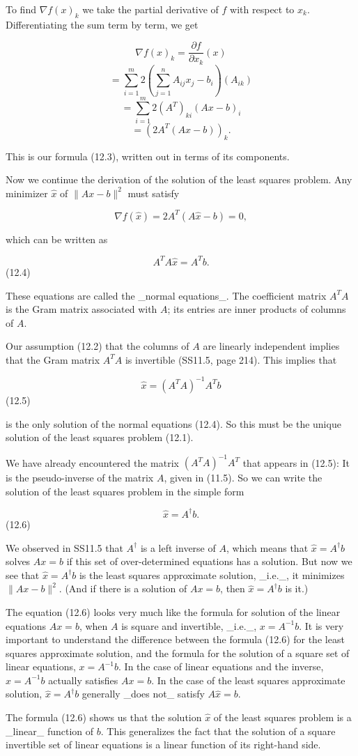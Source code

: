 To find \(\nabla f(x)_{k}\) we take the partial derivative of \(f\) with respect to \(x_{k}\). Differentiating the sum term by term, we get

\[\nabla f(x)_{k} = \frac{\partial f}{\partial x_{k}}(x)\] \[= \sum_{i=1}^{m}2\left(\sum_{j=1}^{n}A_{ij}x_{j}-b_{i}\right)(A_{ik})\] \[= \sum_{i=1}^{m}2(A^{T})_{ki}(Ax-b)_{i}\] \[= \left(2A^{T}(Ax-b)\right)_{k}.\]

This is our formula (12.3), written out in terms of its components.

Now we continue the derivation of the solution of the least squares problem. Any minimizer \(\hat{x}\) of \(\|Ax-b\|^{2}\) must satisfy

\[\nabla f(\hat{x})=2A^{T}(A\hat{x}-b)=0,\]

which can be written as

\[A^{T}A\hat{x}=A^{T}b.\] (12.4)

These equations are called the _normal equations_. The coefficient matrix \(A^{T}A\) is the Gram matrix associated with \(A\); its entries are inner products of columns of \(A\).

Our assumption (12.2) that the columns of \(A\) are linearly independent implies that the Gram matrix \(A^{T}A\) is invertible (SS11.5, page 214). This implies that

\[\hat{x}=(A^{T}A)^{-1}A^{T}b\] (12.5)

is the only solution of the normal equations (12.4). So this must be the unique solution of the least squares problem (12.1).

We have already encountered the matrix \((A^{T}A)^{-1}A^{T}\) that appears in (12.5): It is the pseudo-inverse of the matrix \(A\), given in (11.5). So we can write the solution of the least squares problem in the simple form

\[\hat{x}=A^{\dagger}b.\] (12.6)

We observed in SS11.5 that \(A^{\dagger}\) is a left inverse of \(A\), which means that \(\hat{x}=A^{\dagger}b\) solves \(Ax=b\) if this set of over-determined equations has a solution. But now we see that \(\hat{x}=A^{\dagger}b\) is the least squares approximate solution, _i.e._, it minimizes \(\|Ax-b\|^{2}\). (And if there is a solution of \(Ax=b\), then \(\hat{x}=A^{\dagger}b\) is it.)

The equation (12.6) looks very much like the formula for solution of the linear equations \(Ax=b\), when \(A\) is square and invertible, _i.e._, \(x=A^{-1}b\). It is very important to understand the difference between the formula (12.6) for the least squares approximate solution, and the formula for the solution of a square set of linear equations, \(x=A^{-1}b\). In the case of linear equations and the inverse, \(x=A^{-1}b\) actually satisfies \(Ax=b\). In the case of the least squares approximate solution, \(\hat{x}=A^{\dagger}b\) generally _does not_ satisfy \(A\hat{x}=b\).

The formula (12.6) shows us that the solution \(\hat{x}\) of the least squares problem is a _linear_ function of \(b\). This generalizes the fact that the solution of a square invertible set of linear equations is a linear function of its right-hand side.

 